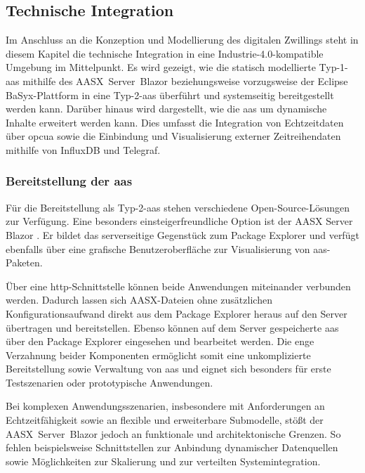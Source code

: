 \subsection{Technische Integration}
Im Anschluss an die Konzeption und Modellierung des digitalen Zwillings steht in diesem Kapitel die technische Integration in eine Industrie-4.0-kompatible Umgebung im Mittelpunkt. 
Es wird gezeigt, wie die statisch modellierte Typ-1-\acs{aas} mithilfe des \mbox{AASX Server Blazor} beziehungsweise vorzugsweise der Eclipse BaSyx-Plattform in eine Typ-2-\acs{aas} überführt und systemseitig bereitgestellt werden kann. 
Darüber hinaus wird dargestellt, wie die \acs{aas} um dynamische Inhalte erweitert werden kann. 
Dies umfasst die Integration von Echtzeitdaten über \acs{opcua} sowie die Einbindung und Visualisierung externer Zeitreihendaten mithilfe von InfluxDB und Telegraf.

\subsubsection{Bereitstellung der \acs{aas}}
\label{sec:bereitstellungAAS}
Für die Bereitstellung als Typ-2-\acs{aas} stehen verschiedene Open-Source-Lösungen zur Verfügung. 
Eine besonders einsteigerfreundliche Option ist der AASX Server Blazor \cite{AASXServer}.
Er bildet das serverseitige Gegenstück zum Package Explorer und verfügt ebenfalls über eine grafische Benutzeroberfläche zur Visualisierung von \acs{aas}-Paketen.

Über eine \acs{http}-Schnittstelle können beide Anwendungen miteinander verbunden werden.
Dadurch lassen sich AASX-Dateien ohne zusätzlichen Konfigurationsaufwand direkt aus dem Package Explorer heraus auf den Server übertragen und bereitstellen.
Ebenso können auf dem Server gespeicherte \acs{aas} über den Package Explorer eingesehen und bearbeitet werden.
Die enge Verzahnung beider Komponenten ermöglicht somit eine unkomplizierte Bereitstellung sowie Verwaltung von \acs{aas} und eignet sich besonders für erste Testszenarien oder prototypische Anwendungen.

Bei komplexen Anwendungsszenarien, insbesondere mit Anforderungen an Echtzeitfähigkeit sowie an flexible und erweiterbare Submodelle, stößt der \mbox{AASX Server Blazor} jedoch an funktionale und architektonische Grenzen. 
So fehlen beispielsweise Schnittstellen zur Anbindung dynamischer Datenquellen sowie Möglichkeiten zur Skalierung und zur verteilten Systemintegration.

\pagebreak

